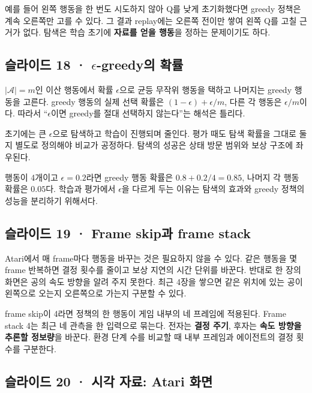 \documentclass[11pt,a4paper]{article}
\begin{document}
예를 들어 왼쪽 행동을 한 번도 시도하지 않아 Q를 낮게 초기화했다면 greedy 정책은 계속 오른쪽만 고를 수 있다. 그 결과 replay에는 오른쪽 전이만 쌓여 왼쪽 Q를 고칠 근거가 없다. 탐색은 학습 초기에 \textbf{자료를 얻을 행동}을 정하는 문제이기도 하다.\par

\subsection{슬라이드 18 · $\epsilon$-greedy의 확률}

$|\mathcal A|=m$인 이산 행동에서 확률 $\epsilon$으로 균등 무작위 행동을 택하고 나머지는 greedy 행동을 고른다. greedy 행동의 실제 선택 확률은 $(1-\epsilon)+\epsilon/m$, 다른 각 행동은 $\epsilon/m$이다. 따라서 “$\epsilon$이면 greedy를 절대 선택하지 않는다”는 해석은 틀리다.\par

초기에는 큰 $\epsilon$으로 탐색하고 학습이 진행되며 줄인다. 평가 때도 탐색 확률을 그대로 둘지 별도로 정의해야 비교가 공정하다. 탐색의 성공은 상태 방문 범위와 보상 구조에 좌우된다.\par

행동이 4개이고 $\epsilon=0.2$라면 greedy 행동 확률은 $0.8+0.2/4=0.85$, 나머지 각 행동 확률은 $0.05$다. 학습과 평가에서 $\epsilon$을 다르게 두는 이유는 탐색의 효과와 greedy 정책의 성능을 분리하기 위해서다.\par

\subsection{슬라이드 19 · Frame skip과 frame stack}

Atari에서 매 frame마다 행동을 바꾸는 것은 필요하지 않을 수 있다. 같은 행동을 몇 frame 반복하면 결정 횟수를 줄이고 보상 지연의 시간 단위를 바꾼다. 반대로 한 장의 화면은 공의 속도 방향을 알려 주지 못한다. 최근 4장을 쌓으면 같은 위치에 있는 공이 왼쪽으로 오는지 오른쪽으로 가는지 구분할 수 있다.\par

frame skip이 4라면 정책의 한 행동이 게임 내부의 네 프레임에 적용된다. Frame stack 4는 최근 네 관측을 한 입력으로 묶는다. 전자는 \textbf{결정 주기}, 후자는 \textbf{속도 방향을 추론할 정보량}을 바꾼다. 환경 단계 수를 비교할 때 내부 프레임과 에이전트의 결정 횟수를 구분한다.\par

\subsection{슬라이드 20 · 시각 자료: Atari 화면}
\end{document}
